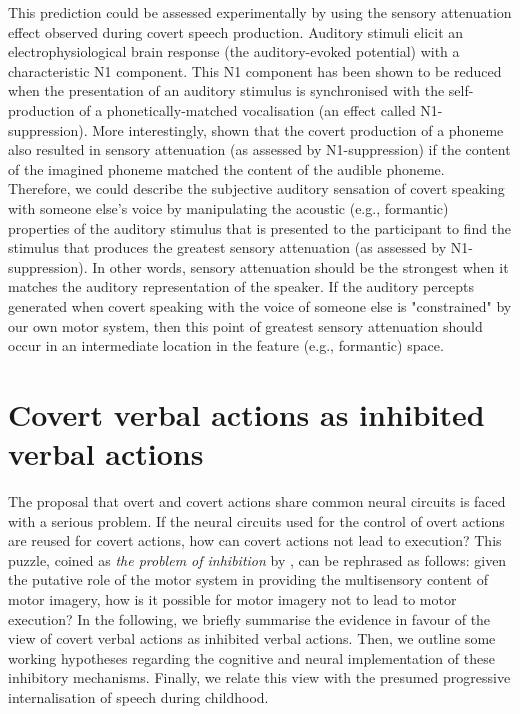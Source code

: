 \documentclass[utf8]{template/frontiersSCNS} %
\begin{document}

This prediction could be assessed experimentally by using the sensory attenuation effect observed during covert speech production. Auditory stimuli elicit an electrophysiological brain response (the auditory-evoked potential) with a characteristic N1 component. This N1 component has been shown to be reduced when the presentation of an auditory stimulus is synchronised with the self-production of a phonetically-matched vocalisation (an effect called N1-suppression). More interestingly, \cite{whitford_neurophysiological_2017} shown that the covert production of a phoneme also resulted in sensory attenuation (as assessed by N1-suppression) if the content of the imagined phoneme matched the content of the audible phoneme. Therefore, we could describe the subjective auditory sensation of covert speaking with someone else’s voice by manipulating the acoustic (e.g., formantic) properties of the auditory stimulus that is presented to the participant to find the stimulus that produces the greatest sensory attenuation (as assessed by N1-suppression). In other words, sensory attenuation should be the strongest when it matches the auditory representation of the speaker. If the auditory percepts generated when covert speaking with the voice of someone else is "constrained" by our own motor system, then this point of greatest sensory attenuation should occur in an intermediate location in the feature (e.g., formantic) space.

\section{Covert verbal actions as inhibited verbal actions}

The proposal that overt and covert actions share common neural circuits is faced with a serious problem. If the neural circuits used for the control of overt actions are reused for covert actions, how can covert actions not lead to execution? This puzzle, coined as \textit{the problem of inhibition} by \cite{jeannerod_neural_2001}, can be rephrased as follows: given the putative role of the motor system in providing the multisensory content of motor imagery, how is it possible for motor imagery not to lead to motor execution? In the following, we briefly summarise the evidence in favour of the view of covert verbal actions as inhibited verbal actions. Then, we outline some working hypotheses regarding the cognitive and neural implementation of these inhibitory mechanisms. Finally, we relate this view with the presumed progressive internalisation of speech during childhood.
\end{document}

